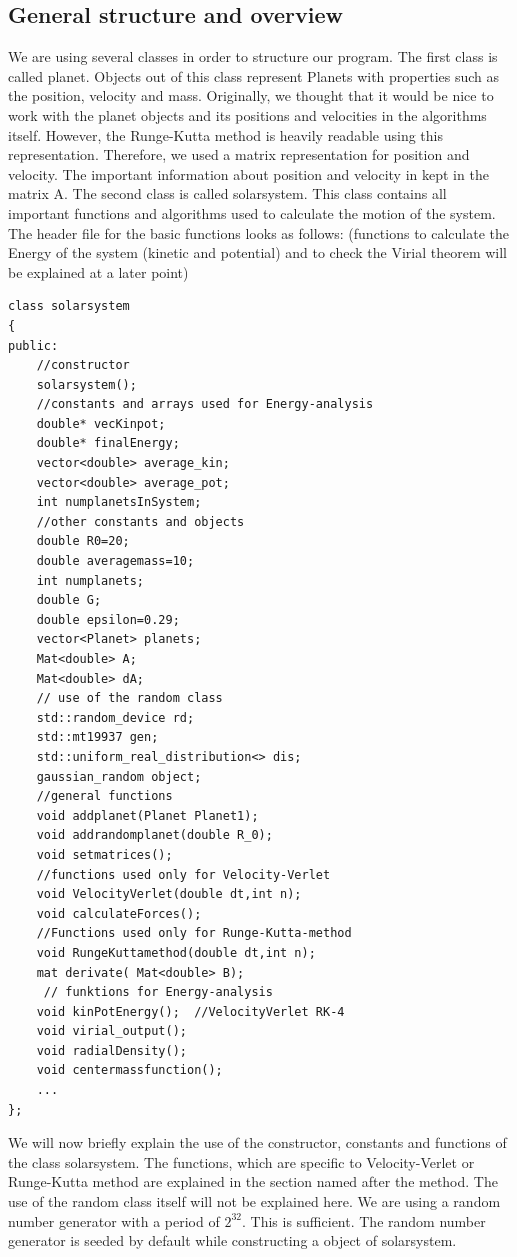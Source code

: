 \documentclass[10pt,a4paper]{article}
\begin{document}
\subsection{General structure and overview}
We are using several classes in order to structure our program. The first class is called planet. Objects out of this class represent Planets with properties such as the position, velocity and mass. Originally, we thought that it would be nice to work with the planet objects and its positions and velocities in the algorithms itself. However, the Runge-Kutta method is heavily readable using this representation. Therefore, we used a matrix representation for position and velocity. The important information about position and velocity in kept in the matrix A. 
The second class is called solarsystem. This class contains all important functions and algorithms used to calculate the motion of the system. 
The header file for the basic functions looks as follows: (functions to calculate the Energy of the system (kinetic and potential) and to check the Virial theorem will be explained at a later point)
\begin{lstlisting}
class solarsystem
{
public:
    //constructor
    solarsystem();
    //constants and arrays used for Energy-analysis
    double* vecKinpot;
    double* finalEnergy;
    vector<double> average_kin; 
    vector<double> average_pot; 
    int numplanetsInSystem;
    //other constants and objects 
    double R0=20;
    double averagemass=10;
    int numplanets;
    double G;
    double epsilon=0.29;
    vector<Planet> planets;
    Mat<double> A;
    Mat<double> dA;
    // use of the random class
    std::random_device rd;
    std::mt19937 gen;
    std::uniform_real_distribution<> dis;
    gaussian_random object;
    //general functions
    void addplanet(Planet Planet1);
    void addrandomplanet(double R_0);
    void setmatrices();
    //functions used only for Velocity-Verlet
    void VelocityVerlet(double dt,int n);
    void calculateForces();
    //Functions used only for Runge-Kutta-method
    void RungeKuttamethod(double dt,int n);
    mat derivate( Mat<double> B);
     // funktions for Energy-analysis
    void kinPotEnergy();  //VelocityVerlet RK-4
    void virial_output();
    void radialDensity();
    void centermassfunction();
    ...
};
\end{lstlisting}
We will now briefly explain the use of the constructor, constants and functions of the class solarsystem. The functions, which are specific to Velocity-Verlet or Runge-Kutta method are explained in the section named after the method. The use of the random class itself will not be explained here. We are using a random number generator with a period of $2^{32}$. This is sufficient. The random number generator is seeded by default while constructing a object of solarsystem. 
\end{document}
